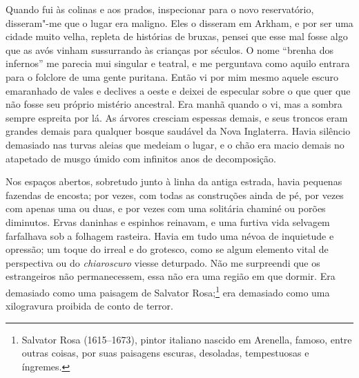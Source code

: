 Quando fui às colinas e aos prados, inspecionar para o novo
reservatório, disseram"-me que o lugar era maligno. Eles o disseram em
Arkham, e por ser uma cidade muito velha, repleta de histórias de
bruxas, pensei que esse mal fosse algo que as avós vinham sussurrando às
crianças por séculos. O nome ``brenha dos infernos'' me parecia mui
singular e teatral, e me perguntava como aquilo entrara para o folclore
de uma gente puritana. Então vi por mim mesmo aquele escuro emaranhado
de vales e declives a oeste e deixei de especular sobre o que quer que
não fosse seu próprio mistério ancestral. Era manhã quando o vi, mas a
sombra sempre espreita por lá. As árvores cresciam espessas demais, e
seus troncos eram grandes demais para qualquer bosque saudável da Nova
Inglaterra. Havia silêncio demasiado nas turvas aleias que medeiam o
lugar, e o chão era macio demais no atapetado de musgo úmido com
infinitos anos de decomposição.

Nos espaços abertos, sobretudo junto à linha da antiga estrada, havia
pequenas fazendas de encosta; por vezes, com todas as construções ainda
de pé, por vezes com apenas uma ou duas, e por vezes com uma solitária
chaminé ou porões diminutos. Ervas daninhas e espinhos reinavam, e uma
furtiva vida selvagem farfalhava sob a folhagem rasteira. Havia em tudo
uma névoa de inquietude e opressão; um toque do irreal e do grotesco,
como se algum elemento vital de perspectiva ou do \emph{chiaroscuro}
viesse deturpado. Não me surpreendi que os estrangeiros não
permanecessem, essa não era uma região em que dormir. Era demasiado como
uma paisagem de Salvator Rosa;\footnote{Salvator Rosa (1615--1673), pintor
  italiano nascido em Arenella, famoso, entre outras coisas, por suas
  paisagens escuras, desoladas, tempestuosas e íngremes.} era demasiado
como uma xilogravura proibida de conto de terror.


